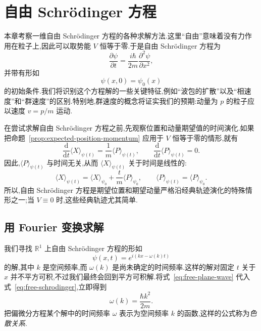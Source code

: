 \chapter{自由 Schrödinger 方程}\label{chap:free-schrodinger}

本章考察一维自由 Schrödinger 方程的各种求解方法.这里“自由”意味着没有力作用在粒子上,因此可以取势能 \(V\) 恒等于零.于是自由 Schrödinger 方程为
\begin{equation}
\frac{\partial\psi}{\partial t}
=\frac{i\hbar}{2m}\frac{\partial^{2}\psi}{\partial x^{2}},
\label{eq:free-schrodinger}
\end{equation}
并带有形如
\[
\psi(x,0)=\psi_{0}(x)
\]
的初始条件.我们将识别这个方程解的一些关键特征,例如“波包的扩散”以及“相速度”和“群速度”的区别.特别地,群速度的概念将证实我们的预期:动量为 \(p\) 的粒子应以速度 \(v=p/m\) 运动.

在尝试求解自由 Schrödinger 方程之前,先观察位置和动量期望值的时间演化.如果把命题~\ref{prop:expected-position-momentum} 应用于 \(V\) 恒等于零的情形,就有
\[
\frac{\mathrm{d}}{\mathrm{d}t}\langle X\rangle_{\psi(t)}
=\frac{1}{m}\langle P\rangle_{\psi(t)},
\qquad
\frac{\mathrm{d}}{\mathrm{d}t}\langle P\rangle_{\psi(t)}=0.
\]
因此,\(\langle P\rangle_{\psi(t)}\) 与时间无关,从而 \(\langle X\rangle_{\psi(t)}\) 关于时间是线性的:
\[
\langle X\rangle_{\psi(t)}
=\langle X\rangle_{\psi_{0}}+\frac{t}{m}\langle P\rangle_{\psi_{0}},
\qquad
\langle P\rangle_{\psi(t)}=\langle P\rangle_{\psi_{0}}.
\]
所以,自由 Schrödinger 方程是期望位置和期望动量严格沿经典轨迹演化的特殊情形之一;当 \(V\equiv0\) 时,这些经典轨迹尤其简单.

\section{用 Fourier 变换求解}\label{sec:free-fourier}

我们寻找 \(\mathbb{R}^{1}\) 上自由 Schrödinger 方程的形如
\begin{equation}
\psi(x,t)=e^{i(kx-\omega(k)t)}
\label{eq:free-plane-wave}
\end{equation}
的解,其中 \(k\) 是空间频率,而 \(\omega(k)\) 是尚未确定的时间频率.这样的解对固定 \(t\) 关于 \(x\) 并不平方可积,不过我们最终会回到平方可积解.将式~\eqref{eq:free-plane-wave} 代入式~\eqref{eq:free-schrodinger},立即得到
\begin{equation}
\omega(k)=\frac{\hbar k^{2}}{2m}.
\label{eq:free-dispersion}
\end{equation}
把偏微分方程某个解中的时间频率 \(\omega\) 表示为空间频率 \(k\) 的函数,这样的公式称为\emph{色散关系}.

